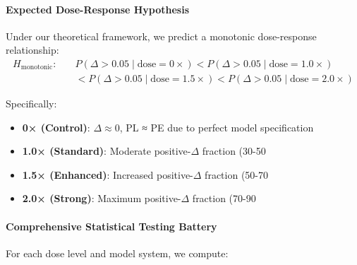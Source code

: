 \documentclass[conference]{IEEEtran}
\begin{document}
\paragraph{Expected Dose-Response Hypothesis}
Under our theoretical framework, we predict a monotonic dose-response relationship:
\begin{align}
H_{\text{monotonic}}: \quad &P(\Delta > 0.05 \mid \text{dose} = 0\times) < P(\Delta > 0.05 \mid \text{dose} = 1.0\times) \\
&< P(\Delta > 0.05 \mid \text{dose} = 1.5\times) < P(\Delta > 0.05 \mid \text{dose} = 2.0\times)
\end{align}

Specifically:
\begin{itemize}
\item \textbf{0× (Control)}: $\Delta \approx 0$, PL ≈ PE due to perfect model specification
\item \textbf{1.0× (Standard)}: Moderate positive-$\Delta$ fraction (30-50%
\item \textbf{1.5× (Enhanced)}: Increased positive-$\Delta$ fraction (50-70%
\item \textbf{2.0× (Strong)}: Maximum positive-$\Delta$ fraction (70-90%
\end{itemize}

\paragraph{Comprehensive Statistical Testing Battery}
For each dose level and model system, we compute:
\end{document}
